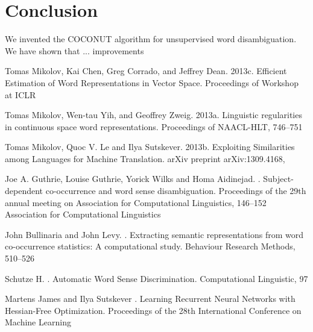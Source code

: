 \documentclass[11pt]{article}
\begin{document}
\section{Conclusion}
We invented the COCONUT algorithm for unsupervised word disambiguation. We have shown that ... improvements


\begin{thebibliography}{}
Tomas Mikolov, Kai Chen, Greg Corrado, and Jeffrey Dean.
\newblock 2013c.
\newblock Efficient Estimation of Word Representations in Vector Space.
\newblock Proceedings of Workshop at ICLR

Tomas Mikolov, Wen-tau Yih, and Geoffrey Zweig.
\newblock 2013a.
\newblock Linguistic regularities in continuous space word representations.
\newblock Proceedings of NAACL-HLT, 
746--751

Tomas Mikolov, Quoc V. Le and Ilya Sutskever.
\newblock 2013b.
\newblock Exploiting Similarities among Languages for Machine Translation.
\newblock arXiv preprint arXiv:1309.4168, 

Joe A. Guthrie, Louise Guthrie, Yorick Wilks and Homa Aidinejad.
.
\newblock Subject-dependent co-occurrence and word sense disambiguation.
\newblock Proceedings of the 29th annual meeting on Association for Computational Linguistics, 
146--152
\newblock
Association for Computational Linguistics

John Bullinaria and John Levy.
.
\newblock Extracting semantic representations from word co-occurrence statistics: A computational study.
\newblock Behaviour Research Methods, 
510--526

Schutze H.
.
\newblock Automatic Word Sense Discrimination.
\newblock Computational Linguistic, 
97

Martens James and Ilya Sutskever
.
\newblock Learning Recurrent Neural Networks with Hessian-Free Optimization.
\newblock Proceedings of the 28th International Conference on Machine Learning

\end{thebibliography}
\end{document}
